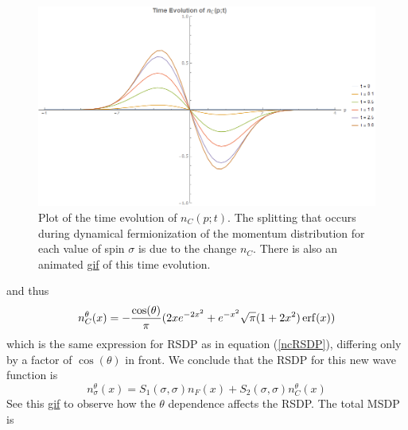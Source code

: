 \documentclass[onecolumn,english,aps,pra]{revtex4}
\begin{document}
\begin{figure}[h]
\includegraphics[scale=0.45]{"../Plots/TimeEvolutionNC"}
\caption{Plot of the time evolution of $n_{C}(p;t)$. The splitting that occurs during dynamical fermionization of the momentum distribution for each value of spin $\sigma$ is due to the change $n_C$. There is also an animated \href{https://github.com/TimSkaras/UltraColdAtoms/blob/master/Plots/TimeEvolutionNC.gif}{gif} of this time evolution.}
\label{fig:ncRSDP-DF}
\end{figure}
and thus 
\begin{equation}
n_C^\theta(x) = -\frac{\cos (\theta)}{\pi} (2xe^{-2x^2} + e^{-x^2}\sqrt{\pi} (1 + 2 x^2) \erf(x))
\end{equation}
which is the same expression for RSDP as in equation (\ref{ncRSDP}), differing only by a factor of $\cos(\theta)$ in front. We conclude that the RSDP for this new wave function is 
\begin{equation}
n_{\sigma}^\theta(x) = S_1(\sigma, \sigma)n_F(x) +  S_2(\sigma,\sigma) n_C^\theta(x)
\end{equation}
See this \href{https://github.com/TimSkaras/UltraColdAtoms/blob/master/Plots/ThetaEvolutionRSDP.gif}{gif} to observe how the $\theta$ dependence affects the RSDP. The total MSDP is 
\end{document}
